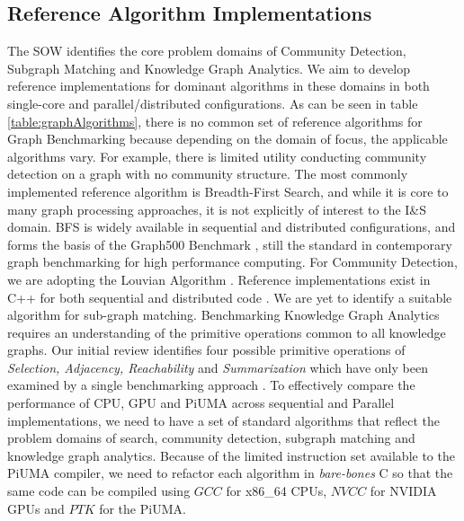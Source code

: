 \documentclass[letterpaper, 10pt]{article}
\begin{document}
\begin{multicols}{2}
        \subsection{Reference Algorithm Implementations}\label{section:referenceAlgorithms}
        \par{The SOW identifies the core problem domains of Community Detection, Subgraph Matching and Knowledge Graph Analytics. 
        We aim to develop reference implementations for dominant algorithms in these domains in both single-core and parallel/distributed configurations.
        As can be seen in table \ref{table:graphAlgorithms}, there is no common set of reference algorithms for Graph Benchmarking because depending on the domain of focus, the applicable algorithms vary. 
        For example, there is limited utility conducting community detection on a graph with no community structure.
        The most commonly implemented reference algorithm is Breadth-First Search, and while it is core to many graph processing approaches, it is not explicitly of interest to the I\&S domain. 
        BFS is widely available in sequential and distributed configurations, and forms the basis of the Graph500 Benchmark \cite{Murphy2010}, still the standard in contemporary graph benchmarking for high performance computing.
        For Community Detection, we are adopting the Louvian Algorithm \cite{Blondel2008}. Reference implementations exist in C++ for both sequential and distributed code \cite{Ghosh2018}. 
        We are yet to identify a suitable algorithm for sub-graph matching.
        Benchmarking Knowledge Graph Analytics requires an understanding of the primitive operations common to all knowledge graphs. 
        Our initial review identifies four possible primitive operations of \textit{Selection, Adjacency, Reachability} and \textit{Summarization} which have only been examined by a single benchmarking approach \cite{Angles2013}. 
        To effectively compare the performance of CPU, GPU and PiUMA across sequential and Parallel implementations, we need to have a set of standard algorithms that reflect the problem domains of search, community detection, subgraph matching and knowledge graph analytics. 
        Because of the limited instruction set available to the PiUMA compiler, we need to refactor each algorithm in \textit{bare-bones} C so that the same code can be compiled using $GCC$ for x86\_64 CPUs, $NVCC$ for NVIDIA GPUs and $PTK$ for the PiUMA}.


\end{multicols}
\end{document}
